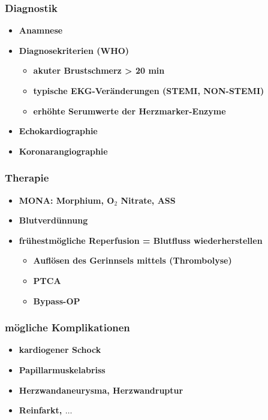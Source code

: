 		\subsubsection{Diagnostik}
			\begin{itemize}
				\item \textbf{Anamnese}
				\item \textbf{Diagnosekriterien (WHO)}
					\begin{itemize}
						\item \textbf{akuter Brustschmerz > 20 min}
						\item \textbf{typische EKG-Veränderungen (STEMI, NON-STEMI)}
						\item \textbf{erhöhte Serumwerte der Herzmarker-Enzyme}
					\end{itemize}
				\item \textbf{Echokardiographie}
				\item \textbf{Koronarangiographie}
			\end{itemize}
		\subsubsection{Therapie}
			\begin{itemize}
			\item \textbf{MONA: Morphium, O$_2$ Nitrate, ASS}
			\item \textbf{Blutverdünnung}
			\item \textbf{frühestmögliche Reperfusion = Blutfluss wiederherstellen}
				\begin{itemize}
					\item \textbf{Auflösen des Gerinnsels mittels (Thrombolyse)}
					\item \textbf{PTCA}
					\item \textbf{Bypass-OP}
				\end{itemize}
			\end{itemize}
		\subsubsection{mögliche Komplikationen}
			\begin{itemize}
				\item \textbf{kardiogener Schock}
				\item \textbf{Papillarmuskelabriss}
				\item \textbf{Herzwandaneurysma, Herzwandruptur}
				\item \textbf{Reinfarkt, $\dots$}
			\end{itemize}

